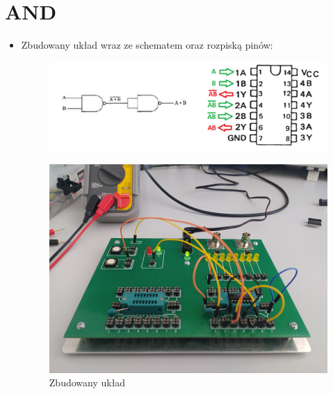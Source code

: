     \section{AND}
        \begin{itemize}
            \item Zbudowany układ wraz ze schematem oraz rozpiską pinów:
                \begin{figure}[H]
                    \centering
                    \includegraphics[width=\textwidth]{img/schemes_with_pins/NAND_and_w_pins.png}
                    \label{NAND:schemat_and_w_pins}
                \end{figure}
                \begin{figure}[H]
                    \centering
                    \includegraphics[width=\textwidth]{img/NAND/funkcje/1652306732610_scaled.png}
                    \caption{Zbudowany układ}
                    \label{NAND:zbudowany_układ_AND}
                \end{figure}
                
            \pagebreak
                

\end{itemize}

